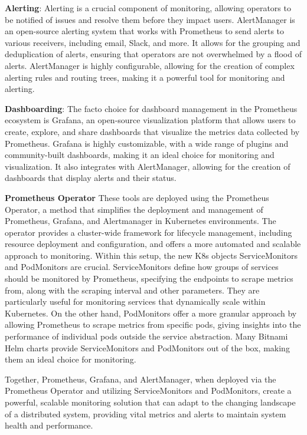 \documentclass{article}
\begin{document}
    \textbf{Alerting}:
    Alerting is a crucial component of monitoring, allowing operators to be notified of issues and resolve them before they impact users. AlertManager is an open-source alerting system that works with Prometheus to send alerts to various receivers, including email, Slack, and more. It allows for the grouping and deduplication of alerts, ensuring that operators are not overwhelmed by a flood of alerts. AlertManager is highly configurable, allowing for the creation of complex alerting rules and routing trees, making it a powerful tool for monitoring and alerting.

    \textbf{Dashboarding}:
    The facto choice for dashboard management in the Prometheus ecosystem is Grafana, an open-source visualization platform that allows users to create, explore, and share dashboards that visualize the metrics data collected by Prometheus. Grafana is highly customizable, with a wide range of plugins and community-built dashboards, making it an ideal choice for monitoring and visualization. It also integrates with AlertManager, allowing for the creation of dashboards that display alerts and their status.

    \textbf{Prometheus Operator}
    These tools are deployed using the Prometheus Operator, a method that simplifies the deployment and management of Prometheus, Grafana, and Alertmanager in Kubernetes environments. The operator provides a cluster-wide framework for lifecycle management, including resource deployment and configuration, and offers a more automated and scalable approach to monitoring. Within this setup, the new K8s objects ServiceMonitors and PodMonitors are crucial. ServiceMonitors define how groups of services should be monitored by Prometheus, specifying the endpoints to scrape metrics from, along with the scraping interval and other parameters. They are particularly useful for monitoring services that dynamically scale within Kubernetes. On the other hand, PodMonitors offer a more granular approach by allowing Prometheus to scrape metrics from specific pods, giving insights into the performance of individual pods outside the service abstraction. Many Bitnami Helm charts provide ServiceMonitors and PodMonitors out of the box, making them an ideal choice for monitoring.

    Together, Prometheus, Grafana, and AlertManager, when deployed via the Prometheus Operator and utilizing ServiceMonitors and PodMonitors, create a powerful, scalable monitoring solution that can adapt to the changing landscape of a distributed system, providing vital metrics and alerts to maintain system health and performance.
\end{document}
